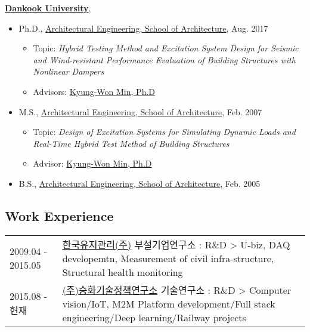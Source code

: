 \href{http://www.dankook.ac.kr/}{\textbf{Dankook University}},
\begin{itemize}
\item Ph.D.,
        \href{http://cms.dankook.ac.kr/web/archi}
             {Architectural Engineering, School of Architecture},
             Aug. 2017
        \begin{itemize}
        \item Topic: \emph{Hybrid Testing Method and Excitation System Design for Seismic and Wind-resistant Performance Evaluation of Building Structures with Nonlinear Dampers}
        \item Advisors:
              \href{http://cms.dankook.ac.kr/web/archi/-16?p_p_id=DeptInfo_WAR_empInfoportlet&p_p_lifecycle=0&p_p_state=normal&p_p_mode=view&p_p_col_id=column-2&p_p_col_count=1&_DeptInfo_WAR_empInfoportlet_empId=2zEyEnhbhLlys2HRljBFWg%3D%3D&_DeptInfo_WAR_empInfoportlet_action=view_message}
                   {Kyung-Won Min, Ph.D}
        \end{itemize}

\item M.S.,
        \href{http://cms.dankook.ac.kr/web/archi}
             {Architectural Engineering, School of Architecture},
             Feb. 2007
        \begin{itemize}
        \item Topic: \emph{Design of Excitation Systems for Simulating Dynamic Loads and Real-Time Hybrid Test Method of Building Structures}
        \item Advisor:
              \href{http://cms.dankook.ac.kr/web/archi/-16?p_p_id=DeptInfo_WAR_empInfoportlet&p_p_lifecycle=0&p_p_state=normal&p_p_mode=view&p_p_col_id=column-2&p_p_col_count=1&_DeptInfo_WAR_empInfoportlet_empId=2zEyEnhbhLlys2HRljBFWg%3D%3D&_DeptInfo_WAR_empInfoportlet_action=view_message}
                   {Kyung-Won Min, Ph.D}
        \end{itemize}
\item B.S.,
        \href{http://cms.dankook.ac.kr/web/archi}
             {Architectural Engineering, School of Architecture},
             Feb. 2005
\end{itemize}

\subsection*{Work Experience}

\begin{tabularx}{\textwidth}{@{}p{}X@{}}
2009.04 - 2015.05 & \href{http://www.kmbest.co.kr/}{한국유지관리(주)} 
부설기업연구소 : R\&D \textgreater{} U-biz, DAQ developemtn, Measurement of civil infra-structure, Structural health monitoring\\
2015.08 - 현재 & \href{http://www.shtpi.co.kr/}{(주)승화기술정책연구소}
 기술연구소 : R\&D \textgreater{} Computer vision/IoT, M2M Platform development/Full stack engineering/Deep learning/Railway projects\\
\end{tabularx}


